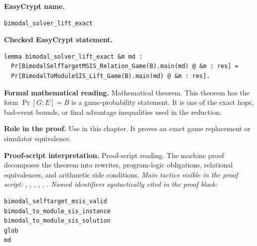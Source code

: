 \begin{formaltheorem}
\noindent\textbf{EasyCrypt name.}
\begin{lstlisting}[language=EasyCrypt,basicstyle=\ttfamily\scriptsize]
bimodal_solver_lift_exact
\end{lstlisting}
\noindent\textbf{Checked EasyCrypt statement.}
\begin{lstlisting}[language=EasyCrypt,basicstyle=\ttfamily\scriptsize]
lemma bimodal_solver_lift_exact &m md :
  Pr[BimodalSelfTargetMSIS_Relation_Game(B).main(md) @ &m : res] =
  Pr[BimodalToModuleSIS_Lift_Game(B).main(md) @ &m : res].
\end{lstlisting}
\noindent\textbf{Formal mathematical reading.}
Mathematical theorem. This theorem has the form \(\Pr[G:E] = B\) is a game-probability statement.  It is one of the exact hops, bad-event bounds, or final advantage inequalities used in the reduction.

\noindent\textbf{Role in the proof.}
Use in this chapter. It proves an exact game replacement or simulator equivalence.

\noindent\textbf{Proof-script interpretation.}
Proof-script reading. The machine proof decomposes the theorem into rewrites, program-logic obligations, relational equivalences, and arithmetic side conditions.
\emph{Main tactics visible in the proof script:} , , , , , .
\emph{Named identifiers syntactically cited in the proof block:}
\begin{lstlisting}[language=EasyCrypt,basicstyle=\ttfamily\scriptsize]
bimodal_selftarget_msis_valid
bimodal_to_module_sis_instance
bimodal_to_module_sis_solution
glob
md
\end{lstlisting}

\end{formaltheorem}

